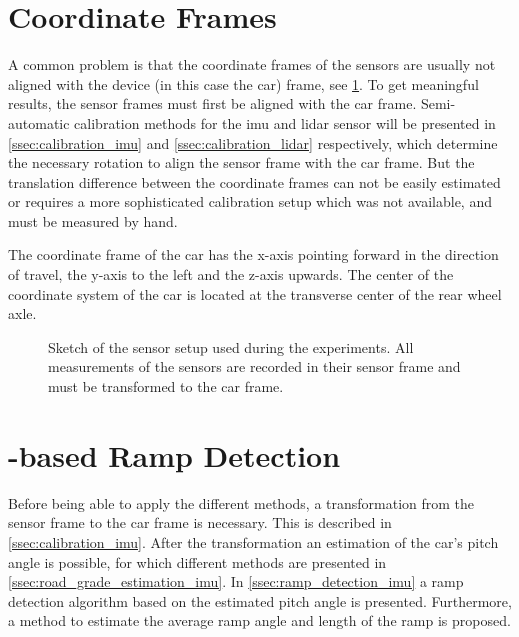 \section{Coordinate Frames}
\label{sec:coordinate_frames}
A common problem is that the coordinate frames of the sensors are usually not aligned with the device (in this case the car) frame, see \cref{fig:tikz_car_frames}.
To get meaningful results, the sensor frames must first be aligned with the car frame.
Semi-automatic calibration methods for the \gls{imu} and \gls{lidar} sensor will be presented in \cref{ssec:calibration_imu} and \cref{ssec:calibration_lidar} respectively, which determine the necessary rotation to align the sensor frame with the car frame.
But the translation difference between the coordinate frames can not be easily estimated or requires a more sophisticated calibration setup which was not available, and must be measured by hand.

The coordinate frame of the car has the x-axis pointing forward in the direction of travel, the y-axis to the left and the z-axis upwards.
The center of the coordinate system of the car is located at the transverse center of the rear wheel axle.
\begin{figure}[htb]
    \centering
    
    \caption[Sensor coordinate frames]{Sketch of the sensor setup used during the experiments. All measurements of the sensors are recorded in their sensor frame and must be transformed to the car frame.}
    \label{fig:tikz_car_frames}
\end{figure}



\section{-based Ramp Detection}
\label{sec:methods_imu}
Before being able to apply the different methods, a transformation from the sensor frame to the car frame is necessary.
This is described in \cref{ssec:calibration_imu}.
After the transformation an estimation of the car's pitch angle is possible, for which different methods are presented in \cref{ssec:road_grade_estimation_imu}.
In \cref{ssec:ramp_detection_imu} a ramp detection algorithm based on the estimated pitch angle is presented.
Furthermore, a method to estimate the average ramp angle and length of the ramp is proposed.

